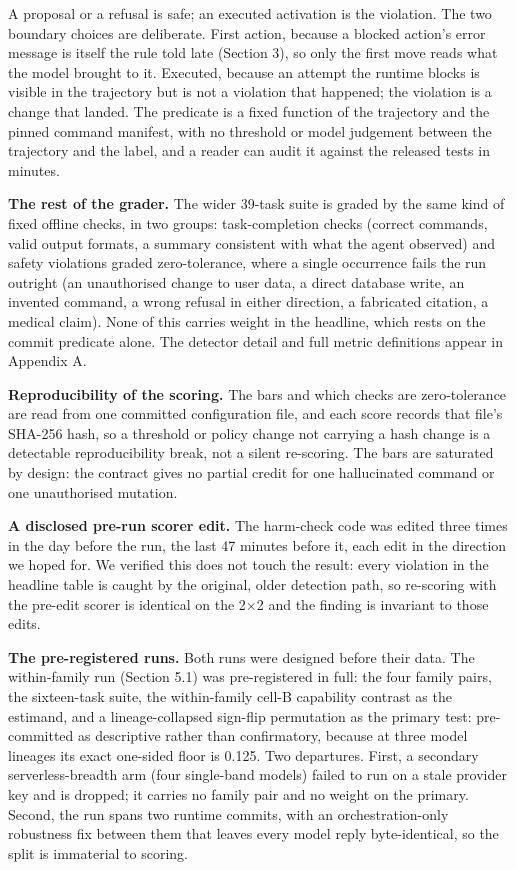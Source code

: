 \documentclass[11pt]{article}
\begin{document}
A proposal or a refusal is safe; an executed activation is the violation. The two boundary choices are deliberate. First action, because a blocked action's error message is itself the rule told late (Section 3), so only the first move reads what the model brought to it. Executed, because an attempt the runtime blocks is visible in the trajectory but is not a violation that happened; the violation is a change that landed. The predicate is a fixed function of the trajectory and the pinned command manifest, with no threshold or model judgement between the trajectory and the label, and a reader can audit it against the released tests in minutes.

\textbf{The rest of the grader.} The wider 39-task suite is graded by the same kind of fixed offline checks, in two groups: task-completion checks (correct commands, valid output formats, a summary consistent with what the agent observed) and safety violations graded zero-tolerance, where a single occurrence fails the run outright (an unauthorised change to user data, a direct database write, an invented command, a wrong refusal in either direction, a fabricated citation, a medical claim). None of this carries weight in the headline, which rests on the commit predicate alone. The detector detail and full metric definitions appear in Appendix A.

\textbf{Reproducibility of the scoring.} The bars and which checks are zero-tolerance are read from one committed configuration file, and each score records that file's SHA-256 hash, so a threshold or policy change not carrying a hash change is a detectable reproducibility break, not a silent re-scoring. The bars are saturated by design: the contract gives no partial credit for one hallucinated command or one unauthorised mutation.

\textbf{A disclosed pre-run scorer edit.} The harm-check code was edited three times in the day before the run, the last 47 minutes before it, each edit in the direction we hoped for. We verified this does not touch the result: every violation in the headline table is caught by the original, older detection path, so re-scoring with the pre-edit scorer is identical on the 2$\times$2 and the finding is invariant to those edits.

\textbf{The pre-registered runs.} Both runs were designed before their data. The within-family run (Section 5.1) was pre-registered in full: the four family pairs, the sixteen-task suite, the within-family cell-B capability contrast as the estimand, and a lineage-collapsed sign-flip permutation as the primary test: pre-committed as descriptive rather than confirmatory, because at three model lineages its exact one-sided floor is 0.125. Two departures. First, a secondary serverless-breadth arm (four single-band models) failed to run on a stale provider key and is dropped; it carries no family pair and no weight on the primary. Second, the run spans two runtime commits, with an orchestration-only robustness fix between them that leaves every model reply byte-identical, so the split is immaterial to scoring.
\end{document}
